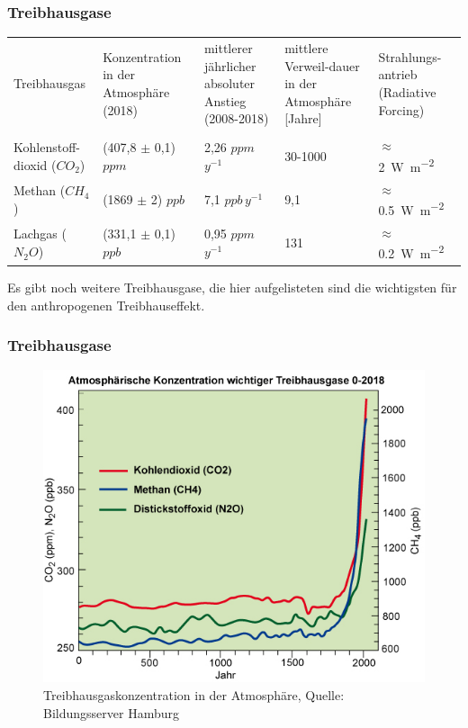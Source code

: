 \begin{frame}
	\frametitle{Treibhausgase} %
	
	
	
	
	\begin{tabular}{p{2.5cm}|p{3cm}|p{3cm}|p{2cm}|p{2cm}}
		Treibhausgas & Konzentration in der Atmosphäre (2018) & mittlerer jährlicher absoluter Anstieg (2008-2018) & mittlere Verweil-dauer in der Atmosphäre [Jahre] & Strahlungs-antrieb (Radiative Forcing) \\ \\ 
		\hline 
		Kohlenstoff-dioxid ($CO_2$) & (407,8 $\pm$ 0,1) $ppm$ & 2,26 $ppm$\,$y^{-1}$ &  30-1000 & $\approx$ \SI{2}{\watt\per\square\metre} \\ 
		\hline 
		Methan ($CH_4$) & (1869 $\pm$ 2) $ppb$ & 7,1 $ppb$\,$y^{-1}$ &9,1 & $\approx $ \SI{0,5}{\watt\per\square\metre}  \\ 
		\hline 
		Lachgas ($N_2O$) & (331,1 $\pm$ 0,1) $ppb$ & 0,95 $ppm$\,$y^{-1}$ & 131 & $\approx $ \SI{0,2}{\watt\per\square\metre}  \\ 
	\end{tabular} 
	Es gibt noch weitere Treibhausgase, die hier aufgelisteten sind die wichtigsten für den anthropogenen Treibhauseffekt.
	
\end{frame}


\begin{frame}
	\frametitle{Treibhausgase}
	\begin{figure}
		\centering
		\includegraphics[width=0.6\linewidth]{bilder/Treibhausgase0-aktuell_bildungsserver_hh.jpg}
		\caption{Treibhausgaskonzentration in der Atmosphäre, Quelle: Bildungsserver Hamburg}
	\end{figure}
\end{frame}



